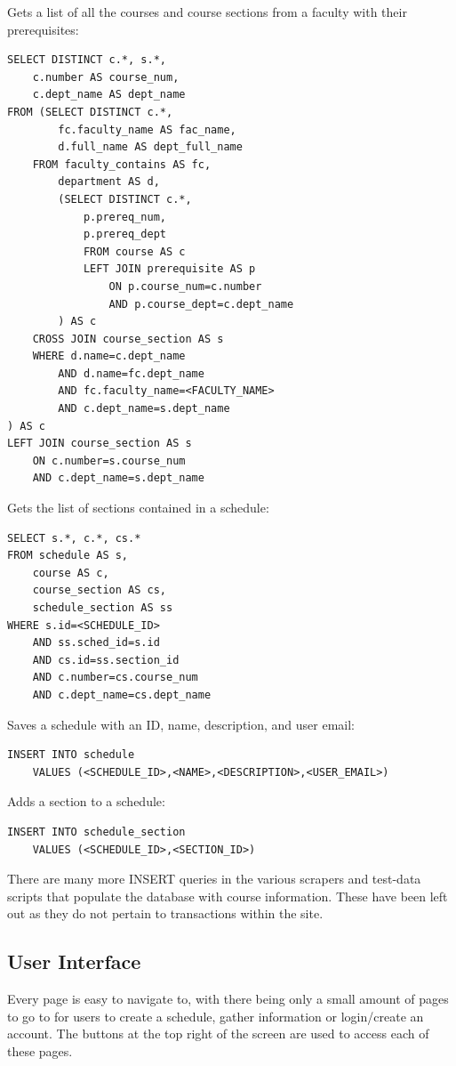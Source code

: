 \documentclass[twoside=false,a4paper,11pt]{article}
\theoremstyle{mytheor}
\begin{document}
\pagebreak

Gets a list of all the courses and course sections from a faculty with their prerequisites:
\begin{lstlisting}
SELECT DISTINCT c.*, s.*,
	c.number AS course_num,
	c.dept_name AS dept_name
FROM (SELECT DISTINCT c.*,
		fc.faculty_name AS fac_name,
		d.full_name AS dept_full_name
	FROM faculty_contains AS fc,
		department AS d,
		(SELECT DISTINCT c.*,
			p.prereq_num,
			p.prereq_dept
			FROM course AS c
			LEFT JOIN prerequisite AS p
				ON p.course_num=c.number
				AND p.course_dept=c.dept_name
		) AS c
	CROSS JOIN course_section AS s
	WHERE d.name=c.dept_name
		AND d.name=fc.dept_name
		AND fc.faculty_name=<FACULTY_NAME>
		AND c.dept_name=s.dept_name
) AS c
LEFT JOIN course_section AS s
	ON c.number=s.course_num
	AND c.dept_name=s.dept_name
\end{lstlisting}

Gets the list of sections contained in a schedule:
\begin{lstlisting}
SELECT s.*, c.*, cs.*
FROM schedule AS s,
	course AS c,
	course_section AS cs,
	schedule_section AS ss 
WHERE s.id=<SCHEDULE_ID>
	AND ss.sched_id=s.id
	AND cs.id=ss.section_id
	AND c.number=cs.course_num
	AND c.dept_name=cs.dept_name
\end{lstlisting}

Saves a schedule with an ID, name, description, and user email:
\begin{lstlisting}
INSERT INTO schedule
	VALUES (<SCHEDULE_ID>,<NAME>,<DESCRIPTION>,<USER_EMAIL>)
\end{lstlisting}

Adds a section to a schedule:
\begin{lstlisting}
INSERT INTO schedule_section
	VALUES (<SCHEDULE_ID>,<SECTION_ID>)
\end{lstlisting}

There are many more INSERT queries in the various scrapers and test-data scripts that populate the database with course information. These have been left out as they do not pertain to transactions within the site.

\subsection*{User Interface}

Every page is easy to navigate to, with there being only a small amount of pages to go to for users to create a schedule, gather information or login/create an account. The buttons at the top right of the screen are used to access each of these pages.
\end{document}
